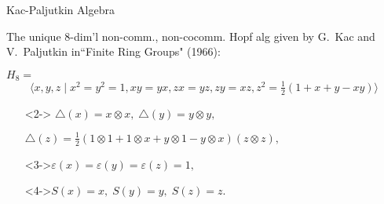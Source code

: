 \documentclass{beamer}
\newcommand\1{_{(1)}}
\newcommand\2{_{(2)}}
\begin{document}
\begin{frame}{Kac-Paljutkin Algebra}


 The unique $8$-dim'l non-comm., non-cocomm. Hopf alg given by G.\ Kac and V.\ Paljutkin in``Finite Ring Groups" (1966):\newline

    $H_8=$
    \[\Big\langle x,y,z\;\vert\; x^2=y^2=1,xy=yx,zx=yz,zy=xz,z^2=\tfrac{1}{2}(1+x+y-xy)\Big\rangle\]
    \vspace{2ex}
    \begin{itemize}
    \setlength{\itemsep}{2ex}
    \item[]<2->
    $\triangle(x)=x\otimes x,\; \triangle(y)=y\otimes y,\;$ 
    
    \vspace{2ex}
    
    $\triangle(z)=\tfrac{1}{2}(1\otimes 1+1\otimes x+y\otimes 1-y\otimes x)(z\otimes z),\;$
    
    \item[]<3->$
    \varepsilon(x)=\varepsilon(y)=\varepsilon(z)=1,$

    \item[]<4->$ S(x)=x,\;S(y)=y,\;S(z)=z.$ 
    \end{itemize}
\end{frame}
\end{document}
